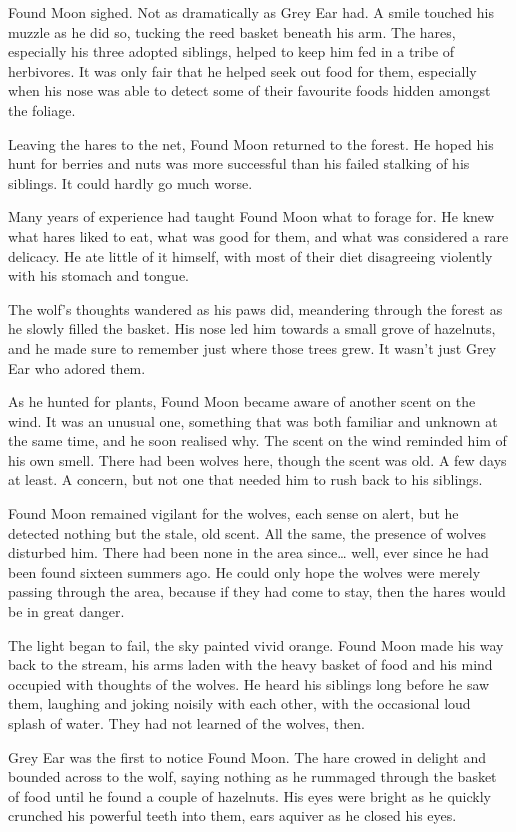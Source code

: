 Found Moon sighed. Not as dramatically as Grey Ear had. A smile touched his muzzle as he did so, tucking the reed basket beneath his arm. The hares, especially his three adopted siblings, helped to keep him fed in a tribe of herbivores. It was only fair that he helped seek out food for them, especially when his nose was able to detect some of their favourite foods hidden amongst the foliage.

Leaving the hares to the net, Found Moon returned to the forest. He hoped his hunt for berries and nuts was more successful than his failed stalking of his siblings. It could hardly go much worse.

Many years of experience had taught Found Moon what to forage for. He knew what hares liked to eat, what was good for them, and what was considered a rare delicacy. He ate little of it himself, with most of their diet disagreeing violently with his stomach and tongue.

The wolf's thoughts wandered as his paws did, meandering through the forest as he slowly filled the basket. His nose led him towards a small grove of hazelnuts, and he made sure to remember just where those trees grew. It wasn't just Grey Ear who adored them.

As he hunted for plants, Found Moon became aware of another scent on the wind. It was an unusual one, something that was both familiar and unknown at the same time, and he soon realised why. The scent on the wind reminded him of his own smell. There had been wolves here, though the scent was old. A few days at least. A concern, but not one that needed him to rush back to his siblings.

Found Moon remained vigilant for the wolves, each sense on alert, but he detected nothing but the stale, old scent. All the same, the presence of wolves disturbed him. There had been none in the area since\ldots{} well, ever since he had been found sixteen summers ago. He could only hope the wolves were merely passing through the area, because if they had come to stay, then the hares would be in great danger.

The light began to fail, the sky painted vivid orange. Found Moon made his way back to the stream, his arms laden with the heavy basket of food and his mind occupied with thoughts of the wolves. He heard his siblings long before he saw them, laughing and joking noisily with each other, with the occasional loud splash of water. They had not learned of the wolves, then.

Grey Ear was the first to notice Found Moon. The hare crowed in delight and bounded across to the wolf, saying nothing as he rummaged through the basket of food until he found a couple of hazelnuts. His eyes were bright as he quickly crunched his powerful teeth into them, ears aquiver as he closed his eyes.

